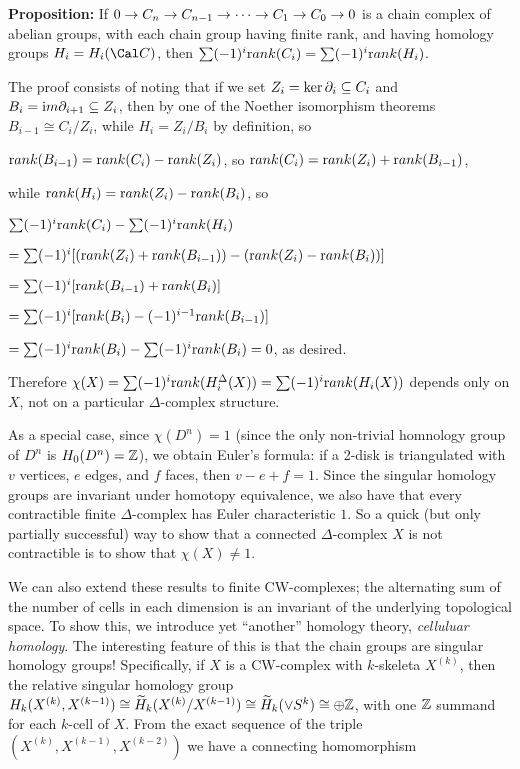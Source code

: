 \ssk

{\bf Proposition:} If $0\rightarrow C_n\rightarrow C_{n-1}\rightarrow \cdots \rightarrow C_1\rightarrow C_0 \rightarrow 0$ is a chain complex of abelian
groups, with each chain group having finite rank, and having homology groups $H_i=H_i({\Cal C})$,
then $\sum (-1)^i {\text rank}(C_i)=\sum (-1)^i {\text rank}(H_i)$.

\ssk

The proof consists of noting that if we set $Z_i=\ker \partial_i\subseteq C_i$ and
$B_i={\text im} \partial_{i+1}\subseteq Z_i$, then by one of the Noether isomorphism
theorems $B_{i-1}\cong C_i/Z_i$, while $H_i=Z_i/B_i$ by definition, so 

\ssk

${\text rank}(B_{i-1})={\text rank}(C_i) - {\text rank}(Z_i)$, so 
${\text rank}(C_i)={\text rank}(Z_i)+{\text rank} (B_{i-1})$, 

while 
${\text rank}(H_i)={\text rank}(Z_i)-{\text rank}(B_i)$,
so 

\ssk

$\sum (-1)^i {\text rank}(C_i)-\sum (-1)^i {\text rank}(H_i)$

$=\sum (-1)^i [({\text rank}(Z_i)+{\text rank} (B_{i-1}))-({\text rank}(Z_i)-{\text rank}(B_i))]$

$=\sum (-1)^i [{\text rank} (B_{i-1})+{\text rank}(B_i)]$

$=\sum (-1)^i[{\text rank}(B_i)-(-1)^{i-1}{\text rank} (B_{i-1})]$

$=\sum (-1)^i{\text rank}(B_i)-\sum (-1)^i{\text rank}(B_i)=0$, as desired.

\msk

Therefore $\chi(X)=\sum (-1)^i {\text rank}(H_i^\Delta(X))=\sum (-1)^i {\text rank}(H_i(X))$
depends only on $X$, not on a particular $\Delta$-complex structure. 

\vfill
\eject

As a special case,
since $\chi(D^n)=1$ (since the only non-trivial homnology group of $D^n$ is $H_0(D^n)={\Bbb Z}$),
we obtain Euler's formula: if a 2-disk is triangulated with $v$ vertices, $e$ edges, and $f$
faces, then $v-e+f=1$. Since the singular homology groups are invariant under homotopy
equivalence, we also have that every contractible finite $\Delta$-complex has Euler characteristic
$1$. So a quick (but only partially successful) way to show that a connected $\Delta$-complex $X$
is not contractible is to show that $\chi(X)\neq 1$.

\msk

We can also extend these results to finite CW-complexes; the alternating sum of the number of cells
in each dimension is an invariant of the underlying topological space. To show this, we introduce
yet ``another'' homology theory, {\it celluluar homology}. The interesting feature of this
is that the chain groups are singular homology groups! Specifically, if $X$ is a CW-complex with
$k$-skeleta $X^{(k)}$, then the relative singular homology group
$H_k(X^{(k)},X^{(k-1)})\cong \widetilde{H}_k(X^{(k)}/X^{(k-1)})\cong\widetilde{H}_k(\vee S^k)\cong \oplus{\Bbb Z}$,
with one ${\Bbb Z}$ summand for each $k$-cell of $X$. From the exact sequence of the triple
$(X^{(k)},X^{(k-1)},X^{(k-2)})$ we have a connecting homomorphism 

